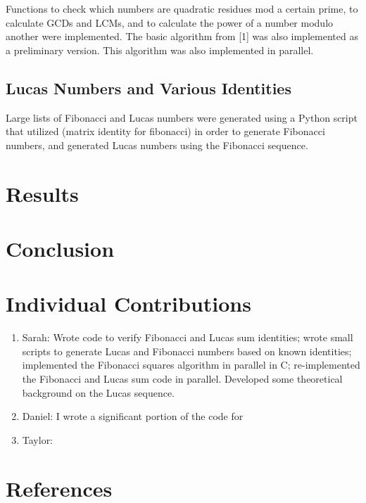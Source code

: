 \documentclass[11pt]{article}
\begin{document}
Functions to check which numbers are quadratic residues mod a certain prime, to calculate GCDs and LCMs, and to calculate the power of a number modulo another were implemented. The basic algorithm from [1] was also implemented as a preliminary version. This algorithm was also implemented in parallel.

\subsection{Lucas Numbers and Various Identities}
Large lists of Fibonacci and Lucas numbers were generated using a Python script that utilized (matrix identity for fibonacci) in order to generate Fibonacci numbers, and generated Lucas numbers using the Fibonacci sequence. 


\section{Results}



\section{Conclusion}



\section{Individual Contributions}

\begin{enumerate}
\item Sarah: Wrote code to verify Fibonacci and Lucas sum identities; wrote small scripts to generate Lucas and Fibonacci numbers based on known identities; implemented the Fibonacci squares algorithm in parallel in C; re-implemented the Fibonacci and Lucas sum code in parallel. Developed some theoretical background on the Lucas sequence.

\item Daniel: I wrote a significant portion of the code for 

\item Taylor:
\end{enumerate}

\section{References}
\end{document}
